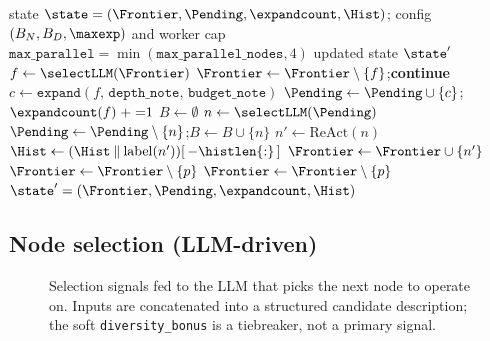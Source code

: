 \begin{algorithm}[t]
\small
\caption{BFTS run-loop (one outer iteration).}
\label{alg:bfts-run-loop}
\begin{algorithmic}[1]
\Require state $\state=(\Frontier,\Pending,\expandcount,\Hist)$;
         config $(B_N, B_D, \maxexp)$ and worker cap
         $\texttt{max\_parallel}=\min(\texttt{max\_parallel\_nodes},4)$
\Ensure  updated state $\state'$
\State {}
  \State $f \gets \selectLLM(\Frontier)$ 
    \State $\Frontier \gets \Frontier \setminus \{f\}$;\;\;\textbf{continue}
  \EndIf
  \State $c \gets \texttt{expand}(f,\,\texttt{depth\_note},\,\texttt{budget\_note})$
  \State $\Pending \gets \Pending \cup \{c\}$;\;\;$\expandcount(f) \mathrel{+}{=} 1$
\EndWhile
\State {}
\State $B \gets \emptyset$
  \State $n \gets \selectLLM(\Pending)$ 
  \State $\Pending \gets \Pending \setminus \{n\}$;\;\;$B \gets B \cup \{n\}$
\EndWhile
{}
  \State $n' \gets \mathrm{ReAct}(n)$ 
  \State $\Hist \gets (\Hist \mathbin{\Vert} \mathrm{label}(n'))[\,-\histlen{:}\,]$ 
  \State $\Frontier \gets \Frontier \cup \{n'\}$
   
      \State $\Frontier \gets \Frontier \setminus \{p\}$
    \EndIf
  \EndFor
   
      \State $\Frontier \gets \Frontier \setminus \{p\}$
    \EndIf
  \EndFor
\EndFor
\State \Return $\state' = (\Frontier,\Pending,\expandcount,\Hist)$
\end{algorithmic}
\end{algorithm}

\subsection{Node selection (LLM-driven)}\label{sec:exploration:node-selection}

\begin{figure}[t]
  \centering
  \resizebox{\columnwidth}{!}{}
  \caption{Selection signals fed to the LLM that picks the next node
           to operate on. Inputs are concatenated into a structured
           candidate description; the soft \texttt{diversity\_bonus}
           is a tiebreaker, not a primary signal.}
  \label{fig:nodescore}
\end{figure}

